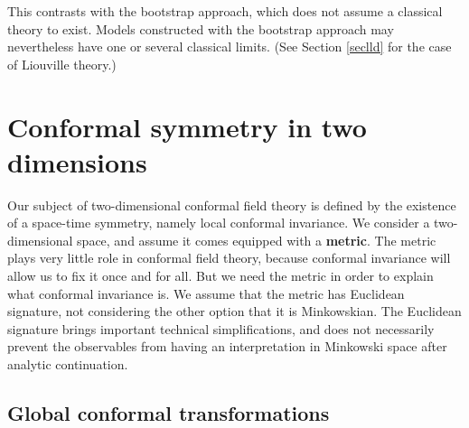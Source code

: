 \documentclass[12pt, a4paper, notitlepage, twoside]{report}
\numberwithin{equation}{section}
\theoremstyle{break}
\begin{document}
This contrasts with the bootstrap approach, which does not assume a classical theory to exist.
Models constructed with the bootstrap approach may nevertheless have one or several classical limits. (See Section \ref{seclld} for the case of Liouville theory.)

\section{Conformal symmetry in two dimensions \label{secconf}}

Our subject of two-dimensional conformal field theory is defined by the existence of a space-time symmetry, namely local conformal invariance. 
We consider a two-dimensional space, and assume it comes equipped with a \textbf{\boldmath metric}.
The metric plays very little role in conformal field theory, because conformal invariance will allow us to fix it once and for all.
But we need the metric in order to explain what conformal invariance is.
We assume that the metric has Euclidean signature, not considering the other option that it is Minkowskian.
The Euclidean signature brings important technical simplifications, and does not necessarily prevent the observables from having an interpretation in Minkowski space after analytic continuation.

\subsection{Global conformal transformations\label{secglob}}
\end{document}

